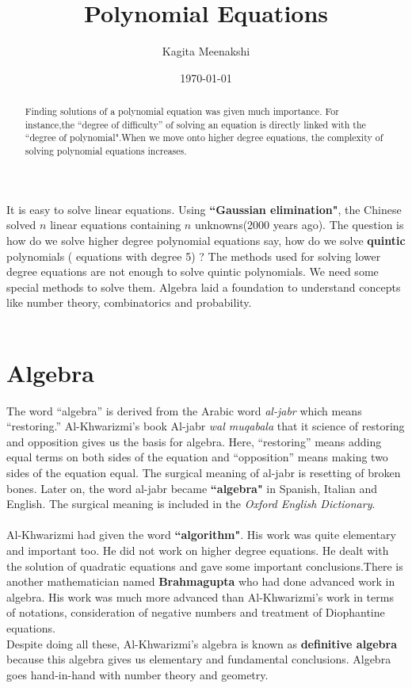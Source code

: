\documentclass[a4paper,reqno,11pt]{amsart}
\theoremstyle{plain}%
\theoremstyle{definition}
\theoremstyle{remark}
\begin{document}
	
	
	\title{\textbf{Polynomial Equations}}
	
	\author[Kagita Meenakshi]{Kagita Meenakshi}
	
	\address{Department of Mathematics, Indian Institute of Technology Hyderabad, Kandi, Sangareddy - 502285}
	
	
	\date{\today}
	
	
	
	\begin{abstract}
		Finding solutions of a polynomial equation was given much importance. For instance,the ``degree of difficulty” of solving an equation is directly linked with the ``degree of polynomial".When we move onto higher degree equations, the complexity of solving polynomial equations increases.
	\end{abstract}
	
	\maketitle
It is easy to solve linear equations. Using \textbf{``Gaussian elimination"}, the Chinese solved $n$ linear equations containing $n$ unknowns(2000 years ago). 
The question is how do we solve higher degree polynomial equations say, how do we solve \textbf{quintic} polynomials ( equations with degree 5) ? The methods used for solving lower degree equations are not enough to solve quintic polynomials. We need some special methods to solve them.
Algebra laid a foundation to understand concepts like number theory, combinatorics and probability.\\
\\
\section{Algebra}
The word ``algebra” is derived from the Arabic word \textit{al-jabr} which means ``restoring.” Al-Khwarizmi's book Al-jabr \textit{wal muqabala} that it science of restoring and opposition gives us the basis for algebra. Here, ``restoring” means adding equal terms on both sides of the equation and ``opposition” means making two sides of the equation equal. The surgical meaning of al-jabr is resetting of broken bones. Later on, the word al-jabr became \textbf{``algebra"} in Spanish, Italian and English. The surgical meaning is included in the \textit{Oxford English Dictionary}. \\
\\
\indent Al-Khwarizmi had given the word \textbf{``algorithm"}. His work was quite elementary and important too. He did not work on higher degree equations. He dealt with the solution of quadratic equations and gave some important conclusions.There is another mathematician named \textbf{Brahmagupta} who had done advanced work in algebra. His work was much more advanced than Al-Khwarizmi's work in terms of notations, consideration of negative numbers and treatment of Diophantine equations.\\
\indent Despite doing all these, Al-Khwarizmi's algebra is known as \textbf{definitive algebra} because this algebra gives us elementary and fundamental conclusions.
Algebra goes hand-in-hand with number theory and geometry. \\
\end{document}
